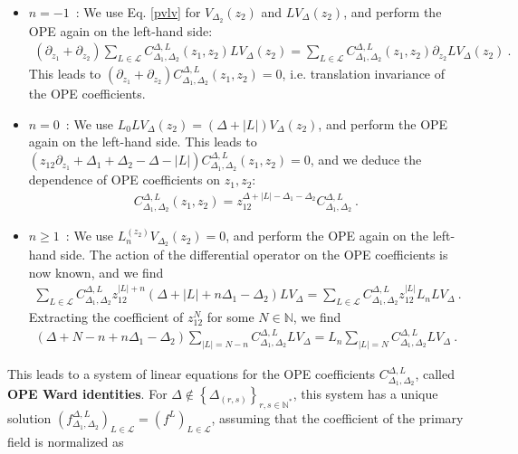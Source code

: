 \documentclass[12pt, a4paper]{article}
\theoremstyle{break}
\begin{document}
\begin{itemize}
 \item $\boxed{n=-1}$\ : We use Eq. \eqref{pvlv} for $V_{\Delta_2}(z_2)$ and $LV_{\Delta}(z_2)$, and perform the OPE again on the left-hand side:
 \begin{align}
 \left(\partial_{z_1}+\partial_{z_2}\right) \sum_{L\in \mathcal{L}} C_{\Delta_1,\Delta_2}^{\Delta, L}(z_1,z_2)LV_\Delta(z_2) = \sum_{L\in \mathcal{L}} C_{\Delta_1,\Delta_2}^{\Delta, L}(z_1,z_2)\partial_{z_2} LV_\Delta(z_2) \ .
 \end{align}
 This leads to $(\partial_{z_1}+\partial_{z_2})C^{\Delta,L}_{\Delta_1,\Delta_2}(z_1,z_2)=0$, i.e. translation invariance of the OPE coefficients.
 \item $\boxed{n=0}$\ : We use $L_0LV_{\Delta}(z_2)= (\Delta+|L|) V_{\Delta}(z_2)$, and perform the OPE again on the left-hand side. This leads to $(z_{12}\partial_{z_1}+\Delta_1+\Delta_2-\Delta-|L|)C^{\Delta,L}_{\Delta_1,\Delta_2}(z_1,z_2) = 0$, and we deduce the dependence of OPE coefficients on $z_1,z_2$:
 \begin{align}
  C^{\Delta,L}_{\Delta_1,\Delta_2}(z_1,z_2) = z_{12}^{\Delta+|L|-\Delta_1-\Delta_2} C^{\Delta,L}_{\Delta_1,\Delta_2}\ . 
 \end{align}
\item $\boxed{n\geq 1}$\ : We use $L_n^{(z_2)}V_{\Delta_2}(z_2)=0$, and perform the OPE again on the left-hand side. The action of the differential operator on the OPE coefficients is now known, and we find 
\begin{align}
 \sum_{L\in\mathcal{L}} C^{\Delta,L}_{\Delta_1,\Delta_2}z_{12}^{|L|+n}(\Delta+|L|+n\Delta_1-\Delta_2) LV_{\Delta}= \sum_{L\in\mathcal{L}} C^{\Delta,L}_{\Delta_1,\Delta_2}z_{12}^{|L|}L_n LV_{\Delta}\ .
\end{align}
Extracting the coefficient of $z_{12}^N$ for some $N\in\mathbb{N}$, we find 
\begin{align}
 (\Delta+N-n+n\Delta_1-\Delta_2)\sum_{|L|=N-n} C^{\Delta,L}_{\Delta_1,\Delta_2}LV_{\Delta} = L_n \sum_{|L|=N}C^{\Delta,L}_{\Delta_1,\Delta_2} LV_{\Delta}\ .
 \label{opew}
\end{align}
\end{itemize}
This leads to a system of linear equations for the OPE coefficients $C^{\Delta,L}_{\Delta_1,\Delta_2}$, called \textbf{OPE Ward identities}. For $\Delta\notin \left\{\Delta_{(r,s)}\right\}_{r,s\in\mathbb{N}^*}$, this system has a unique solution $\left(f^{\Delta,L}_{\Delta_1,\Delta_2}\right)_{L\in\mathcal{L}}=\left(f^L\right)_{L\in\mathcal{L}}$, assuming that the coefficient of the primary field is normalized as
\end{document}
